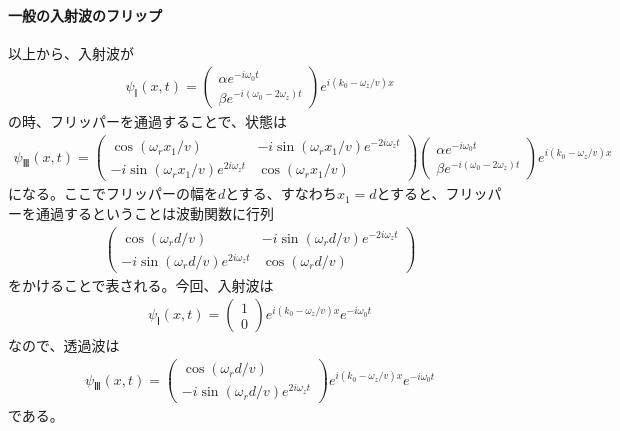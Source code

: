 \paragraph{一般の入射波のフリップ}
以上から、入射波が
\begin{align}
{\psi}_{Ⅰ}(x,t)=
\begin{pmatrix}
{\alpha}e^{-i\omega_{0}t} \\
{\beta}e^{-i(\omega_{0}-2\omega_{z})t}
\end{pmatrix}
e^{i(k_{0}-\omega_{z}/v)x}
\end{align}
の時、フリッパーを通過することで、状態は
\begin{align}
{\psi}_{Ⅲ}(x,t) 
=\begin{pmatrix}
\cos({{\omega_{r}}x_{1}/v}) &-i\sin({{\omega_{r}}x_{1}/v})e^{-2i\omega_{z}t} \\
-i\sin({{\omega_{r}}x_{1}/v})e^{2i\omega_{z}t} &\cos({{\omega_{r}}x_{1}/v})
\end{pmatrix}\begin{pmatrix}
{\alpha}e^{-i\omega_{0}t} \\
{\beta}e^{-i(\omega_{0}-2\omega_{z})t}
\end{pmatrix}
e^{i(k_{0}-\omega_{z}/v)x}
\end{align}
になる。ここでフリッパーの幅を$d$とする、すなわち$x_{1}=d$とすると、フリッパーを通過するということは波動関数に行列
\begin{align}
\begin{pmatrix}
\cos({{\omega_{r}}d/v}) &-i\sin({{\omega_{r}}d/v})e^{-2i\omega_{z}t} \\
-i\sin({{\omega_{r}}d/v})e^{2i\omega_{z}t} &\cos({{\omega_{r}}d/v})
\end{pmatrix}
\end{align}
をかけることで表される。今回、入射波は
\begin{align}
{\psi}_{Ⅰ}(x,t)=
\begin{pmatrix}
1 \\
0
\end{pmatrix}
e^{i(k_{0}-\omega_{z}/v)x}e^{-i\omega_{0}t}
\end{align}
なので、透過波は
\begin{align}
{\psi}_{Ⅲ}(x,t)=
\begin{pmatrix}
\cos({{\omega_{r}}d/v}) \\
-i\sin({{\omega_{r}}d/v})e^{2i\omega_{z}t}
\end{pmatrix}
e^{i(k_{0}-\omega_{z}/v)x}e^{-i\omega_{0}t}
\end{align}
である。
